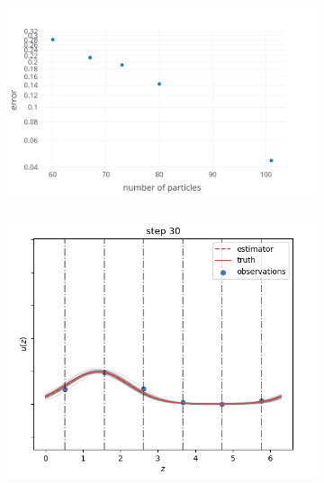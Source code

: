 \begin{figure}
	\centering
	\begin{subfigure}{0.39\textwidth}
		\includegraphics[width=\textwidth]{images/app1d/error_support/error_support.png}
		\label{error_support1}
	\end{subfigure}
	\hfill
	\begin{subfigure}{0.29\textwidth}
		\includegraphics[width=\textwidth]{images/app1d/error_support/ok.png}
		\label{error_support2}
	\end{subfigure}
	\hfill
	\begin{subfigure}{0.29\textwidth}

\end{subfigure}
\end{figure}
